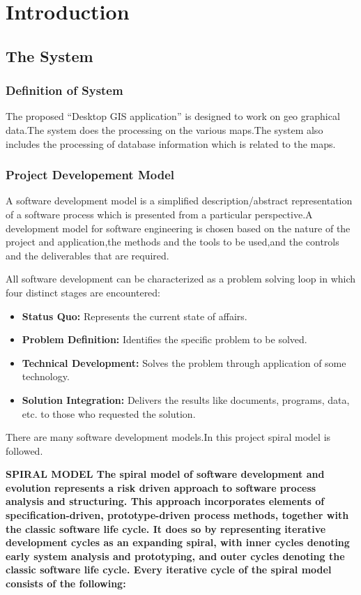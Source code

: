 \chapter{Introduction}

\section{The System}
\subsection{Definition of System}
The proposed “Desktop GIS application” is designed to work on geo graphical data.The system does the processing on the various maps.The system also includes the processing of database information which is related to the maps.

\subsection{Project Developement Model}
A software development model is a simplified description/abstract representation of a software process which is presented from a particular perspective.A development model for software engineering is chosen based on the nature of the project and application,the methods and the tools to be used,and the controls and the deliverables that are required.

All software development can be characterized as a problem solving loop   in which four distinct stages are encountered:
\begin{itemize}
\item {\bf Status Quo:} Represents the current state of affairs.
\item {\bf Problem Definition:} Identifies the specific problem to be solved.
\item {\bf Technical  Development:} Solves the problem through application of some technology.
\item {\bf Solution Integration:} Delivers  the  results  like  documents, programs, data, etc. to those who requested the solution.
\end{itemize}
There are many software development models.In this project spiral model is followed.

\bf{SPIRAL MODEL}
The spiral model of software development and evolution represents a risk driven approach to software process     analysis and structuring. This approach incorporates elements of specification-driven, prototype-driven process methods, together with the classic software life cycle. It does so by representing iterative development cycles as an expanding spiral, with inner cycles denoting early system analysis and prototyping, and outer cycles denoting the classic software life cycle. Every iterative cycle of the spiral  model consists of the following:

